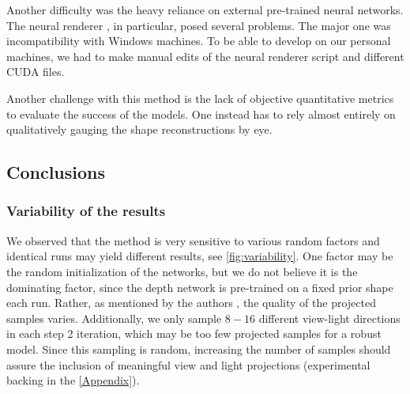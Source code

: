 Another difficulty was the heavy reliance on external pre-trained neural networks. 
The neural renderer \cite{neural-renderer}, in particular, posed several problems. The major one was incompatibility with Windows machines. To be able to develop on our personal machines, we had to make manual edits of the neural renderer script and different CUDA files.

Another challenge with this method is the lack of objective quantitative metrics to evaluate the success of the models. One instead has to rely almost entirely on qualitatively gauging the shape reconstructions by eye.

\subsection{Conclusions}

\subsubsection{Variability of the results}
\label{sec:variability}
We observed that the method is very sensitive to various random factors and identical runs may yield different results, see \autoref{fig:variability}. One factor may be the random initialization of the networks, but we do not believe it is the dominating factor, since the depth network is pre-trained on a fixed prior shape each run. Rather, as mentioned by the authors \cite{gan2shape}, the quality of the projected samples varies. 
Additionally, we only sample $8-16$ different view-light directions in each step 2 iteration, which may be too few projected samples for a robust model. Since this sampling is random, increasing the number of samples should assure the inclusion of meaningful view and light projections (experimental backing in the \autoref{Appendix}).

